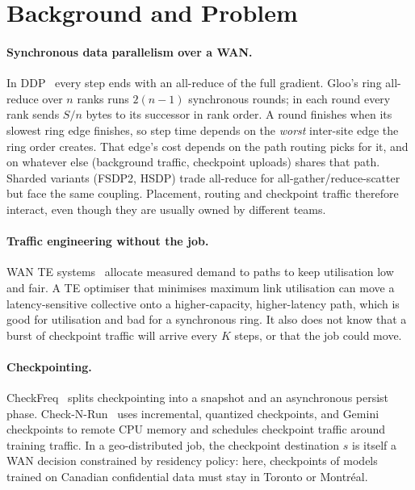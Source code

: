 \section{Background and Problem}
\label{sec:background}

\paragraph{Synchronous data parallelism over a WAN.}
In DDP~\citep{fsdp} every step ends with an all-reduce of the full gradient. Gloo's ring all-reduce over
$n$ ranks runs $2(n-1)$ synchronous rounds; in each round every rank sends $S/n$ bytes to its successor
in rank order. A round finishes when its slowest ring edge finishes, so step time depends on the
\emph{worst} inter-site edge the ring order creates. That edge's cost depends on the path routing picks
for it, and on whatever else (background traffic, checkpoint uploads) shares that path. Sharded variants
(FSDP2, HSDP) trade all-reduce for all-gather/reduce-scatter but face the same coupling.
Placement, routing and checkpoint traffic therefore interact, even though they are usually owned by
different teams.

\paragraph{Traffic engineering without the job.}
WAN TE systems~\citep{b4,swan} allocate measured demand to paths to keep utilisation low and fair. A TE
optimiser that minimises maximum link utilisation can move a latency-sensitive collective onto a
higher-capacity, higher-latency path, which is good for utilisation and bad for a synchronous ring. It also
does not know that a burst of checkpoint traffic will arrive every $K$ steps, or that the job could move.

\paragraph{Checkpointing.}
CheckFreq~\citep{checkfreq} splits checkpointing into a snapshot and an asynchronous persist phase.
Check-N-Run~\citep{checknrun} uses incremental, quantized checkpoints, and Gemini~\citep{gemini}
checkpoints to remote CPU memory and schedules checkpoint traffic around training traffic. In a
geo-distributed job, the checkpoint destination $s$ is itself a WAN decision constrained by residency
policy: here, checkpoints of models trained on Canadian confidential data must stay in Toronto or
Montr\'eal.

